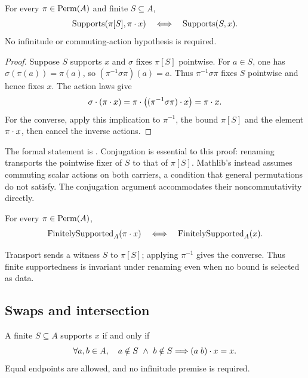 \begin{proposition}
\label{prop:support-transport}
For every $\pi\in\operatorname{Perm}(A)$ and finite $S\subseteq A$,
\[
  \operatorname{Supports}(\pi[S],\pi\mathbin{\cdot} x)
  \quad\Longleftrightarrow\quad
  \operatorname{Supports}(S,x).
\]
No infinitude or commuting-action hypothesis is required.
\end{proposition}

\begin{proof}
Suppose $S$ supports $x$ and $\sigma$ fixes $\pi[S]$ pointwise.
For $a\in S$, one has $\sigma(\pi(a))=\pi(a)$, so
$(\pi^{-1}\sigma\pi)(a)=a$.
Thus $\pi^{-1}\sigma\pi$ fixes $S$ pointwise and hence fixes $x$.
The action laws give
\[
  \sigma\mathbin{\cdot}(\pi\mathbin{\cdot} x)
  =\pi\mathbin{\cdot}\bigl((\pi^{-1}\sigma\pi)\mathbin{\cdot} x\bigr)
  =\pi\mathbin{\cdot} x.
\]
For the converse, apply this implication to $\pi^{-1}$, the bound
$\pi[S]$ and the element $\pi\mathbin{\cdot} x$, then cancel the inverse actions.
\end{proof}

The formal statement is . Conjugation is essential
to this proof: renaming transports the pointwise fixer of $S$ to that of
$\pi[S]$. Mathlib's  instead assumes
commuting scalar actions on both carriers, a condition that general
permutations do not satisfy. The conjugation argument accommodates their
noncommutativity directly.

\begin{proposition}
\label{prop:finitely-supported-transport}
For every $\pi\in\operatorname{Perm}(A)$,
\[
  \operatorname{FinitelySupported}_A(\pi\mathbin{\cdot} x)
  \quad\Longleftrightarrow\quad
  \operatorname{FinitelySupported}_A(x).
\]
\end{proposition}

Transport sends a witness $S$ to $\pi[S]$; applying $\pi^{-1}$ gives the
converse. Thus finite supportedness is
invariant under renaming even when no bound is selected as data.

\subsection{Swaps and intersection}
\label{sec:support-swap-criterion}
\label{sec:support-intersection}

\begin{proposition}
\label{prop:support-swap-criterion}
A finite $S\subseteq A$ supports $x$ if and only if
\[
  \forall a,b\in A,\quad a\notin S\ \land\ b\notin S
  \Longrightarrow(a\;b)\mathbin{\cdot} x=x.
\]
Equal endpoints are allowed, and no infinitude premise is required.
\end{proposition}

